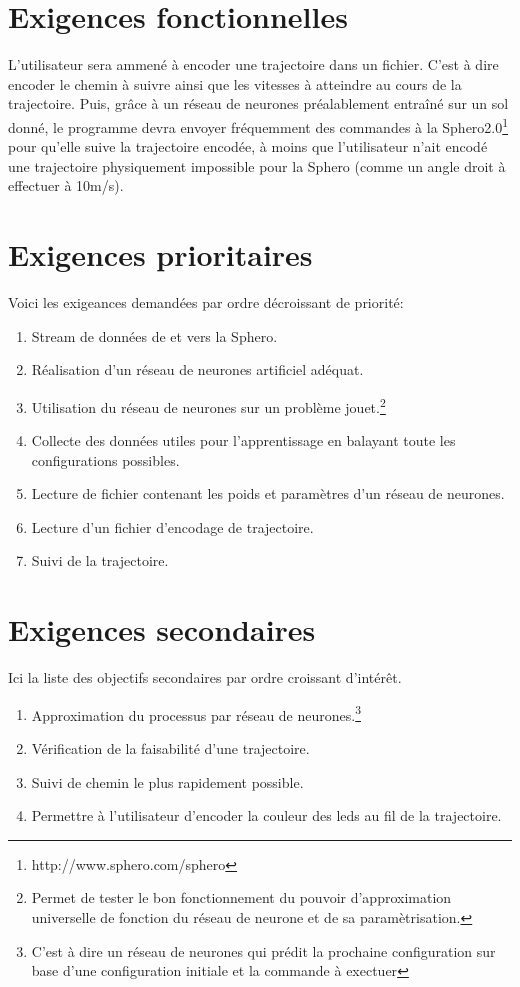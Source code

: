 \documentclass[a4paper, 12pt]{report}
\begin{document}


\section*{Exigences fonctionnelles}
L'utilisateur sera ammené à encoder une trajectoire dans un fichier. C'est à dire encoder le chemin à suivre ainsi que les vitesses à atteindre au cours de la trajectoire.
Puis, grâce à un réseau de neurones préalablement entraîné sur un sol donné, le programme devra envoyer fréquemment des commandes à la Sphero2.0\footnote{http://www.sphero.com/sphero} pour qu'elle suive la trajectoire encodée, à moins que l'utilisateur n'ait encodé une trajectoire physiquement impossible pour la Sphero (comme un angle droit à effectuer à 10m/s).

\section*{Exigences prioritaires}
Voici les exigeances demandées par ordre décroissant de priorité:
\begin{enumerate}
 \item Stream de données de et vers la Sphero.
 \item Réalisation d'un réseau de neurones artificiel adéquat.
 \item Utilisation du réseau de neurones sur un problème jouet.\footnote{Permet de tester le bon fonctionnement du pouvoir d'approximation universelle de fonction du réseau de neurone et de sa paramètrisation.}
 \item Collecte des données utiles pour l'apprentissage en balayant toute les configurations possibles.
 \item Lecture de fichier contenant les poids et paramètres d'un réseau de neurones.
 \item Lecture d'un fichier d'encodage de trajectoire.
 \item Suivi de la trajectoire.
\end{enumerate}

\section*{Exigences secondaires}
Ici la liste des objectifs secondaires par ordre croissant d'intérêt.
\begin{enumerate}
 \item Approximation du processus par réseau de neurones.\footnote{C'est à dire un réseau de neurones qui prédit la prochaine configuration sur base d'une configuration initiale et la commande à exectuer}
 \item Vérification de la faisabilité d'une trajectoire.
 \item Suivi de chemin le plus rapidement possible.
 \item Permettre à l'utilisateur d'encoder la couleur des leds au fil de la trajectoire.
\end{enumerate}
\end{document}
